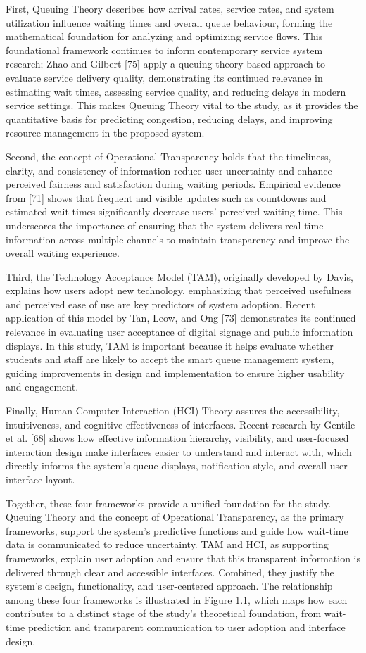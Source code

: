 \documentclass{research}
\begin{document}
First, Queuing Theory describes how arrival rates, service rates, and system utilization influence waiting times and overall queue behaviour, forming the mathematical foundation for analyzing and optimizing service flows. This foundational framework continues to inform contemporary service system research; Zhao and Gilbert [75] apply a queuing theory-based approach to evaluate service delivery quality, demonstrating its continued relevance in estimating wait times, assessing service quality, and reducing delays in modern service settings. This makes Queuing Theory vital to the study, as it provides the quantitative basis for predicting congestion, reducing delays, and improving resource management in the proposed system.

Second, the concept of Operational Transparency holds that the timeliness, clarity, and consistency of information reduce user uncertainty and enhance perceived fairness and satisfaction during waiting periods. Empirical evidence from [71] shows that frequent and visible updates such as countdowns and estimated wait times significantly decrease users' perceived waiting time. This underscores the importance of ensuring that the system delivers real-time information across multiple channels to maintain transparency and improve the overall waiting experience.

Third, the Technology Acceptance Model (TAM), originally developed by Davis, explains how users adopt new technology, emphasizing that perceived usefulness and perceived ease of use are key predictors of system adoption. Recent application of this model by Tan, Leow, and Ong [73] demonstrates its continued relevance in evaluating user acceptance of digital signage and public information displays. In this study, TAM is important because it helps evaluate whether students and staff are likely to accept the smart queue management system, guiding improvements in design and implementation to ensure higher usability and engagement.

Finally, Human-Computer Interaction (HCI) Theory assures the accessibility, intuitiveness, and cognitive effectiveness of interfaces. Recent research by Gentile et al. [68] shows how effective information hierarchy, visibility, and user-focused interaction design make interfaces easier to understand and interact with, which directly informs the system's queue displays, notification style, and overall user interface layout.

Together, these four frameworks provide a unified foundation for the study. Queuing Theory and the concept of Operational Transparency, as the primary frameworks, support the system's predictive functions and guide how wait-time data is communicated to reduce uncertainty. TAM and HCI, as supporting frameworks, explain user adoption and ensure that this transparent information is delivered through clear and accessible interfaces. Combined, they justify the system's design, functionality, and user-centered approach. The relationship among these four frameworks is illustrated in Figure 1.1, which maps how each contributes to a distinct stage of the study's theoretical foundation, from wait-time prediction and transparent communication to user adoption and interface design.
\end{document}
